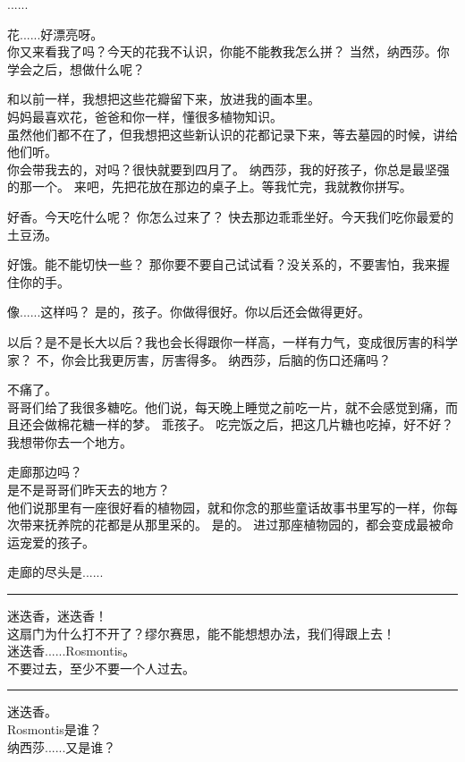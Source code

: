 \documentclass[openany]{book}
\begin{document}
\begin{dialogue}
     ......\par
    花......好漂亮呀。\\
    你又来看我了吗？今天的花我不认识，你能不能教我怎么拼？
     当然，纳西莎。你学会之后，想做什么呢？\par
    和以前一样，我想把这些花瓣留下来，放进我的画本里。\\
    妈妈最喜欢花，爸爸和你一样，懂很多植物知识。\\
    虽然他们都不在了，但我想把这些新认识的花都记录下来，等去墓园的时候，讲给他们听。\\
    你会带我去的，对吗？很快就要到四月了。
     纳西莎，我的好孩子，你总是最坚强的那一个。
     来吧，先把花放在那边的桌子上。等我忙完，我就教你拼写。\par
    好香。今天吃什么呢？
     你怎么过来了？
     快去那边乖乖坐好。今天我们吃你最爱的土豆汤。\par
    好饿。能不能切快一些？
     那你要不要自己试试看？没关系的，不要害怕，我来握住你的手。\par
    像......这样吗？
     是的，孩子。你做得很好。你以后还会做得更好。\par
    以后？是不是长大以后？我也会长得跟你一样高，一样有力气，变成很厉害的科学家？
     不，你会比我更厉害，厉害得多。
     纳西莎，后脑的伤口还痛吗？\par
    不痛了。\\
    哥哥们给了我很多糖吃。他们说，每天晚上睡觉之前吃一片，就不会感觉到痛，而且还会做棉花糖一样的梦。
     乖孩子。
     吃完饭之后，把这几片糖也吃掉，好不好？我想带你去一个地方。\par
    走廊那边吗？\\
    是不是哥哥们昨天去的地方？\\
    他们说那里有一座很好看的植物园，就和你念的那些童话故事书里写的一样，你每次带来抚养院的花都是从那里采的。
     是的。
     进过那座植物园的，都会变成最被命运宠爱的孩子。\par
    走廊的尽头是......
    \par\noindent\rule{\textwidth}{0.4pt}
    迷迭香，迷迭香！\\
    这扇门为什么打不开了？缪尔赛思，能不能想想办法，我们得跟上去！\\
    迷迭香......Rosmontis。\\
    不要过去，至少不要一个人过去。
    \par\noindent\rule{\textwidth}{0.4pt}
    迷迭香。\\
    Rosmontis是谁？\\
    纳西莎......又是谁？
\end{dialogue}
\end{document}
